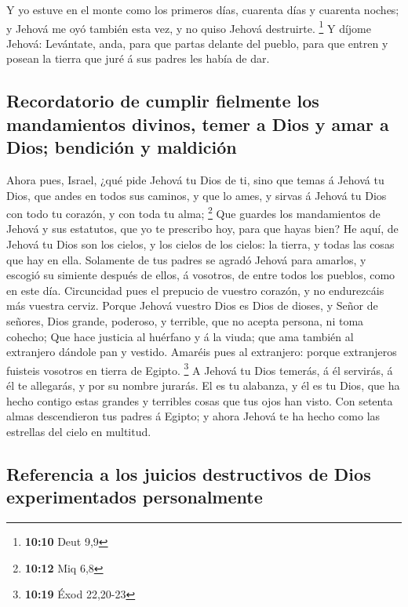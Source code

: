  Y yo estuve en el monte como los primeros días, cuarenta
días y cuarenta noches; y Jehová me oyó también esta vez, y no quiso
Jehová destruirte. \footnote{\textbf{10:10} Deut 9,9}  Y
díjome Jehová: Levántate, anda, para que partas delante del pueblo, para
que entren y posean la tierra que juré á sus padres les había de dar.

\hypertarget{recordatorio-de-cumplir-fielmente-los-mandamientos-divinos-temer-a-dios-y-amar-a-dios-bendiciuxf3n-y-maldiciuxf3n}{%
\subsection{Recordatorio de cumplir fielmente los mandamientos divinos,
temer a Dios y amar a Dios; bendición y
maldición}\label{recordatorio-de-cumplir-fielmente-los-mandamientos-divinos-temer-a-dios-y-amar-a-dios-bendiciuxf3n-y-maldiciuxf3n}}

 Ahora pues, Israel, ¿qué pide Jehová tu Dios de ti, sino
que temas á Jehová tu Dios, que andes en todos sus caminos, y que lo
ames, y sirvas á Jehová tu Dios con todo tu corazón, y con toda tu alma;
\footnote{\textbf{10:12} Miq 6,8}  Que guardes los
mandamientos de Jehová y sus estatutos, que yo te prescribo hoy, para
que hayas bien?  He aquí, de Jehová tu Dios son los cielos,
y los cielos de los cielos: la tierra, y todas las cosas que hay en
ella.  Solamente de tus padres se agradó Jehová para
amarlos, y escogió su simiente después de ellos, á vosotros, de entre
todos los pueblos, como en este día.  Circuncidad pues el
prepucio de vuestro corazón, y no endurezcáis más vuestra cerviz.
 Porque Jehová vuestro Dios es Dios de dioses, y Señor de
señores, Dios grande, poderoso, y terrible, que no acepta persona, ni
toma cohecho;  Que hace justicia al huérfano y á la viuda;
que ama también al extranjero dándole pan y vestido. 
Amaréis pues al extranjero: porque extranjeros fuisteis vosotros en
tierra de Egipto. \footnote{\textbf{10:19} Éxod 22,20-23} 
A Jehová tu Dios temerás, á él servirás, á él te allegarás, y por su
nombre jurarás.  El es tu alabanza, y él es tu Dios, que ha
hecho contigo estas grandes y terribles cosas que tus ojos han visto.
 Con setenta almas descendieron tus padres á Egipto; y
ahora Jehová te ha hecho como las estrellas del cielo en multitud.

\hypertarget{referencia-a-los-juicios-destructivos-de-dios-experimentados-personalmente}{%
\subsection{Referencia a los juicios destructivos de Dios experimentados
personalmente}\label{referencia-a-los-juicios-destructivos-de-dios-experimentados-personalmente}}

